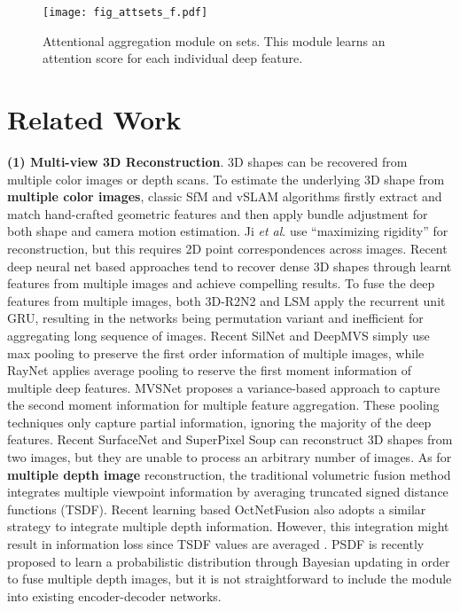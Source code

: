 \documentclass[twocolumn]{svjour3}    \pdfoutput=1
\newcommand{\etal}{\textit{et al}. }
\begin{document}
\begin{figure*}[t]
\centering
   \texttt{[image: fig\_attsets\_f.pdf]}
\caption{Attentional aggregation module on sets. This module learns an attention score for each individual deep feature.}
\label{fig:attsets_f}
\vspace{-0.2cm}
\end{figure*}

\section{Related Work}
\textbf{(1) Multi-view 3D Reconstruction}. 3D shapes can be recovered from multiple color images or depth scans. To estimate the underlying 3D shape from \textbf{multiple color images}, classic SfM \citep{Ozyesil2017} and vSLAM \citep{Cadena2016} algorithms firstly extract and match hand-crafted geometric features \citep{Hartley2004} and then apply bundle adjustment \citep{Triggs2000} for both shape and camera motion estimation. Ji \etal{} \citep{Ji2017a} use ``maximizing rigidity'' for reconstruction, but this requires 2D point correspondences across images. Recent deep neural net based approaches tend to recover dense 3D shapes through learnt features from multiple images and achieve compelling results. To fuse the deep features from multiple images, both 3D-R2N2 \citep{Chan2016} and LSM \citep{Kar2017} apply the recurrent unit GRU, resulting in the networks being permutation variant and inefficient for aggregating long sequence of images. Recent SilNet \citep{Wiles2017,Wiles2018a} and DeepMVS \citep{Huang2018} simply use max pooling to preserve the first order information of multiple images, while RayNet \citep{Paschalidou2018} applies average pooling to reserve the first moment information of multiple deep features. MVSNet \citep{Yao2018} proposes a variance-based approach to capture the second moment information for multiple feature aggregation. These pooling techniques only capture partial information, ignoring the majority of the deep features. Recent SurfaceNet \citep{Ji2017b} and SuperPixel Soup \citep{Kumar2017} can reconstruct 3D shapes from two images, but they are unable to process an arbitrary number of images. As for \textbf{multiple depth image} reconstruction, the traditional volumetric fusion method \citep{Curless1996,Cao2018} integrates multiple viewpoint information by averaging truncated signed distance functions (TSDF). Recent learning based OctNetFusion \citep{Riegler2017} also adopts a similar strategy to integrate multiple depth information. However, this integration might result in information loss since TSDF values are averaged \citep{Riegler2017}. PSDF \citep{Dong2018} is recently proposed to learn a probabilistic distribution through Bayesian updating in order to fuse multiple depth images, but it is not straightforward to include the module into existing encoder-decoder networks. 
\end{document}
